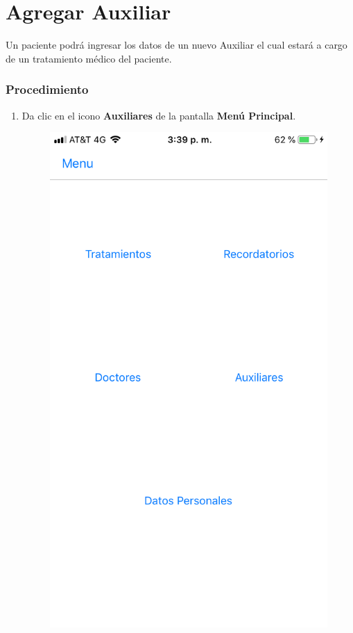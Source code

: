 \section{Agregar Auxiliar}

Un paciente podrá ingresar los datos de un nuevo Auxiliar el cual
estará a cargo de un tratamiento médico del paciente.

\subsubsection{Procedimiento}
\begin{enumerate}
	
	\item Da clic en el icono \textbf{Auxiliares} de la pantalla \textbf{Menú Principal}.

		\begin{figure}[!htbp]			\hypertarget{fig:mpPaciente6}{\hspace{1pt}}
		\begin{center}
			\includegraphics[height=0.4\textheight]{Paciente/AgregarAuxiliar/images/mpPaciente}

\end{center}
\end{figure}
\end{enumerate}
